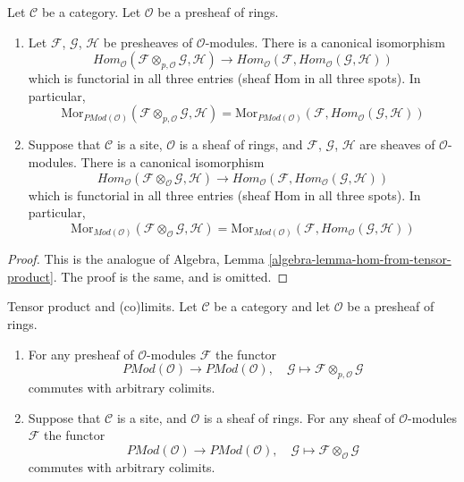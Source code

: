 \begin{lemma}
\label{lemma-internal-hom-adjoint-tensor}
Let $\mathcal{C}$ be a category. Let $\mathcal{O}$ be a presheaf of
rings.
\begin{enumerate}
\item Let $\mathcal{F}$, $\mathcal{G}$, $\mathcal{H}$ be
presheaves of $\mathcal{O}$-modules. There is a canonical isomorphism
$$
\textit{Hom}_{\mathcal{O}}
(\mathcal{F} \otimes_{p, \mathcal{O}} \mathcal{G}, \mathcal{H})
\longrightarrow
\textit{Hom}_{\mathcal{O}}
(\mathcal{F}, \textit{Hom}_{\mathcal{O}}(\mathcal{G}, \mathcal{H}))
$$
which is functorial in all three entries (sheaf Hom in
all three spots). In particular,
$$
\text{Mor}_{\textit{PMod}(\mathcal{O})}(
\mathcal{F} \otimes_{p, \mathcal{O}} \mathcal{G}, \mathcal{H})
=
\text{Mor}_{\textit{PMod}(\mathcal{O})}(
\mathcal{F}, \textit{Hom}_{\mathcal{O}}(\mathcal{G}, \mathcal{H}))
$$
\item
Suppose that $\mathcal{C}$ is a site, $\mathcal{O}$ is a sheaf of rings,
and $\mathcal{F}$, $\mathcal{G}$, $\mathcal{H}$ are sheaves of
$\mathcal{O}$-modules. There is a canonical isomorphism
$$
\textit{Hom}_{\mathcal{O}}
(\mathcal{F} \otimes_{\mathcal{O}} \mathcal{G}, \mathcal{H})
\longrightarrow
\textit{Hom}_{\mathcal{O}}
(\mathcal{F}, \textit{Hom}_{\mathcal{O}}(\mathcal{G}, \mathcal{H}))
$$
which is functorial in all three entries (sheaf Hom in
all three spots). In particular,
$$
\text{Mor}_{\textit{Mod}(\mathcal{O})}(
\mathcal{F} \otimes_{\mathcal{O}} \mathcal{G}, \mathcal{H})
=
\text{Mor}_{\textit{Mod}(\mathcal{O})}(
\mathcal{F}, \textit{Hom}_{\mathcal{O}}(\mathcal{G}, \mathcal{H}))
$$
\end{enumerate}
\end{lemma}

\begin{proof}
This is the analogue of
Algebra, Lemma \ref{algebra-lemma-hom-from-tensor-product}.
The proof is the same, and is omitted.
\end{proof}

\begin{lemma}
\label{lemma-tensor-commute-colimits}
Tensor product and (co)limits.
Let $\mathcal{C}$ be a category and let $\mathcal{O}$ be a presheaf of rings.
\begin{enumerate}
\item For any presheaf of $\mathcal{O}$-modules $\mathcal{F}$ the functor
$$
\textit{PMod}(\mathcal{O}) \longrightarrow \textit{PMod}(\mathcal{O})
,\quad
\mathcal{G} \longmapsto \mathcal{F} \otimes_{p, \mathcal{O}} \mathcal{G}
$$
commutes with arbitrary colimits.
\item
Suppose that $\mathcal{C}$ is a site, and $\mathcal{O}$ is a sheaf of rings.
For any sheaf of $\mathcal{O}$-modules $\mathcal{F}$ the functor
$$
\textit{PMod}(\mathcal{O}) \longrightarrow \textit{PMod}(\mathcal{O})
,\quad
\mathcal{G} \longmapsto \mathcal{F} \otimes_\mathcal{O} \mathcal{G}
$$
commutes with arbitrary colimits.
\end{enumerate}
\end{lemma}

